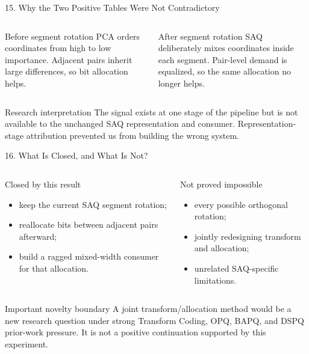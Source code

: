 \documentclass[aspectratio=169]{beamer}
\begin{document}
\begin{frame}{15. Why the Two Positive Tables Were Not Contradictory}
\begin{columns}[T]
\begin{block}{Before segment rotation}
PCA orders coordinates from high to low importance. Adjacent pairs inherit
large differences, so bit allocation helps.
\end{block}
\begin{block}{After segment rotation}
SAQ deliberately mixes coordinates inside each segment. Pair-level demand is
equalized, so the same allocation no longer helps.
\end{block}
\end{columns}
\begin{alertblock}{Research interpretation}
The signal exists at one stage of the pipeline but is not available to the
unchanged SAQ representation and consumer. Representation-stage attribution
prevented us from building the wrong system.
\end{alertblock}
\end{frame}

\begin{frame}{16. What Is Closed, and What Is Not?}
\begin{columns}[T]
\begin{block}{Closed by this result}
\begin{itemize}
  \item keep the current SAQ segment rotation;
  \item reallocate bits between adjacent pairs afterward;
  \item build a ragged mixed-width consumer for that allocation.
\end{itemize}
\end{block}
\begin{block}{Not proved impossible}
\begin{itemize}
  \item every possible orthogonal rotation;
  \item jointly redesigning transform and allocation;
  \item unrelated SAQ-specific limitations.
\end{itemize}
\end{block}
\end{columns}
\begin{alertblock}{Important novelty boundary}
A joint transform/allocation method would be a new research question under
strong Transform Coding, OPQ, BAPQ, and DSPQ prior-work pressure. It is not a
positive continuation supported by this experiment.
\end{alertblock}
\end{frame}
\end{document}
